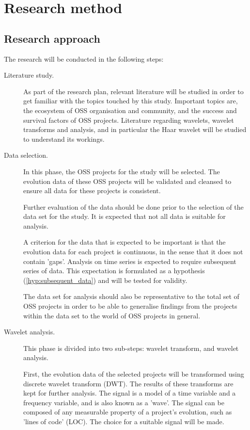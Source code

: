 \chapter{Research method}
\label{method}

\section{Research approach}
The research will be conducted in the following steps:
\begin{description}
	\item[Literature study.] As part of the research plan, relevant literature will
	be studied in order to get familiar with the topics touched by this
	study. Important topics are, the ecosystem of OSS organisation and community,
	and the success and survival factors of OSS projects. Literature regarding
	wavelets, wavelet transforms and analysis, and in particular the Haar wavelet
	will be studied to understand its workings.

	\item[Data selection.] In this phase, the OSS projects for the study will be
	selected. The evolution data of these OSS projects will be validated and
	cleansed to ensure all data for these projects is consistent.

	Further evaluation of the data should be done prior to the selection of the
	data set for the study. It is expected that not all data is suitable for
	analysis.

	A criterion for the data that is expected to be important is that the
	evolution data for each project is continuous, in the sense that it does not
	contain 'gaps'. Analysis on time series is expected to require subsequent
	series of data. This expectation is formulated as a hypothesis
	(\ref{hyp:subsequent_data}) and will be tested for validity.
	
	The data set for analysis should also be representative to the total set of
	OSS projects in order to be able to generalise findings from the
	projects within the data set to the world of OSS projects in general.
	
	\item[Wavelet analysis.] This phase is divided into two sub-steps: wavelet
	transform, and wavelet analysis.
	
	First, the evolution data of the selected projects will be transformed using
	discrete wavelet transform (DWT). The results of these transforms are kept for
	further analysis. The signal is a model of a time variable and a frequency
	variable, and is also known as a 'wave'. The signal can be composed of any
	measurable property of a project's evolution, such as 'lines of code' (LOC).
	The choice for a suitable signal will be made.
	

\end{description}
